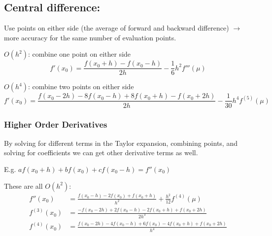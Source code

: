\documentclass[12pt]{article}
\begin{document}
\subsection*{Central difference:}
Use points on either side (the average of forward and backward difference) $\rightarrow$ more accuracy for the same number of evaluation  points.

\underline{$O(h^2)$}: combine one point on either side
\[f'(x_0) = \frac{f(x_0 + h) - f(x_0 - h)}{2h} - \frac{1}{6}h^2 f'''(\mu)\]

\underline{$O(h^4)$}: combine two points on either side
\[f'(x_0) = \frac{f(x_0 - 2h) - 8f(x_0 - h) + 8f(x_0 + h) - f(x_0 + 2h)}{2h} - \frac{1}{30}h^4 f^{(5)}(\mu)\]

\subsubsection*{Higher Order Derivatives}
By solving for different terms in the Taylor expansion, combining points, and solving for coefficients we can get other derivative terms as well. 

E.g. $a f(x_0 + h) + b f(x_0) + c f(x_0 - h) = f''(x_0)$

These are all $O(h^2)$:
\begin{align*}
f''(x_0) &= \frac{f(x_0 - h) - 2f(x_0) + f(x_0 + h)}{h^2} + \frac{h^2}{12}f^{(4)}(\mu) \\
%
f^{(3)}(x_0) &= \frac{-f(x_0 - 2h) + 2f(x_0 - h) - 2f(x_0 + h) + f(x_0 + 2h)}{2h^3}\\
%
f^{(4)}(x_0) &= \frac{f(x_0 - 2h) - 4f(x_0 - h) +6f(x_0) - 4f(x_0 + h) + f(x_0 + 2h)}{h^4}
\end{align*}
\end{document}
